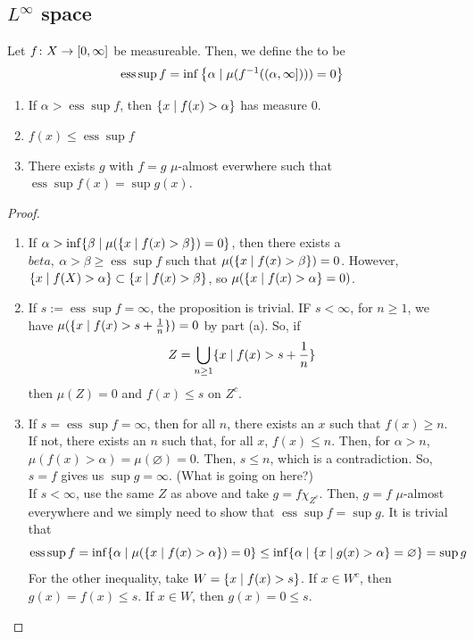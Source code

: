 \documentclass[11pt,leqno,oneside]{amsbook}
\numberwithin{thm}{section}
\newcommand{\ess}{\operatorname{ess}}
\renewcommand{\emptyset}{\varnothing}
\begin{document}
\subsection{\(L^\infty\) space}
\begin{defn}
  Let \(f \colon X \to [0,\infty]\) be measureable. Then, we define the
   to be \[
    \ess\sup f = \inf \left\{ \alpha \st \mu(f^{-1}((\alpha,\infty])))
      = 0 \right\}
  \]
\end{defn}
\begin{prop}
  \begin{enumerate}
  \item If \(\alpha > \ess\sup f\), then \(\{x \mid f(x) > \alpha\}\)
    has measure 0.
  \item \(f(x) \leq \ess \sup f\)
  \item There exists \(g\) with \(f = g\) \(\mu\)-almost everwhere
    such that \(\ess \sup f(x) = \sup g(x)\). 
  \end{enumerate}
\end{prop}
\begin{proof}
  \begin{enumerate}
  \item If \(\alpha > \inf \{\beta \mid \mu(\{x \mid f(x) > \beta\}) =
    0\}\), then there exists a \(beta,\ \alpha > \beta \geq \ess\sup
    f\) such that \(\mu(\{x \mid f(x) > \beta\}) = 0\). However, \(\{x
    \mid f(X) > \alpha\} \subset \{x \mid f(x) > \beta\}\), so \(\mu(\{x
    \mid f(x) > \alpha\} = 0)\).
  \item If \(s := \ess \sup f = \infty\), the proposition is
    trivial. IF \(s < \infty\), for \(n \geq 1\), we have \(\mu(\{x
    \mid f(x) > s + \frac{1}{n}\}) = 0\) by part (a). So, if \[
      Z = \bigcup_{n \geq 1} \{x \mid f(x) > s + \frac{1}{n}\}
    \]
    then \(\mu(Z) = 0\) and \(f(x) \leq s\) on \(Z^c\).
  \item If \(s = \ess\sup f = \infty\), then for all \(n\), there
    exists an \(x\) such that \(f(x) \geq n\). If not, there exists an
    \(n\) such that, for all \(x\), \(f(x) \leq n\). Then, for
    \(\alpha > n\), \(\mu(f(x) > \alpha) = \mu(\emptyset) = 0\). Then,
    \(s \leq n\), which is a contradiction. So, \(s = f\) gives us
    \(\sup g = \infty\). (What is going on here?) \\

    If \(s < \infty\), use the same \(Z\) as above and take \(g = f
    \chi_{Z^c}\). Then, \(g = f\) \(\mu\)-almost everywhere and we
    simply need to show that \(\ess \sup f = \sup g\). It is trivial
    that \[
      \ess\sup f = \inf \{\alpha \st \mu(\{x \st f(x) > \alpha\}) = 0\} \leq \inf
      \{\alpha \st \{x \st g(x) > \alpha\} = \emptyset\} = \sup g
    \]
    For the other inequality, take \(W = \{x \mid f(x) > s\}\). If \(x
    \in W^c\), then \(g(x) = f(x) \leq s\). If \(x \in W\), then
    \(g(x) = 0 \leq s\). 
  \end{enumerate}
\end{proof}
\end{document}
